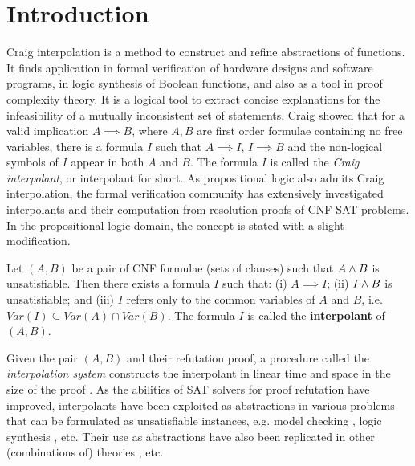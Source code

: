 \section{Introduction}

Craig interpolation is a method to construct and refine abstractions
of functions. It finds application in formal verification of hardware
designs and software programs, in logic synthesis of Boolean
functions, and also as a tool in proof complexity theory. It is a
logical tool to extract concise explanations for the infeasibility of
a mutually inconsistent set of statements. Craig
\cite{craig-interpolate} showed that for a valid implication $A
\implies B$, where $A, B$ are first order formulae containing no free
variables, there is a formula $I$ such that $A \implies I$, $I
\implies B$ and the non-logical symbols of $I$ appear in both $A$ and
$B$. The formula $I$ is called the {\it Craig interpolant}, or
interpolant for short. As  
propositional logic also admits Craig interpolation, the formal
verification community has extensively investigated interpolants and
their computation from resolution proofs of CNF-SAT problems. In the
propositional logic domain, the concept is stated with a slight
modification.  

\begin{Definition}\label{def:ci}
Let $(A, B)$ be a pair of CNF formulae (sets of clauses) such that $A
\wedge B$ is unsatisfiable. Then there exists a formula $I$ such that: (i)
$A\implies I$; (ii) $I \wedge B$ is unsatisfiable; and (iii) $I$ refers
only to the common variables of $A$ and $B$, i.e. $Var(I) \subseteq
Var(A) \cap Var(B)$. The formula $I$ is called the {\bf interpolant}
of $(A,B)$. 
\end{Definition}

Given the pair $(A, B)$ and their refutation proof, a procedure called
the {\it interpolation system} constructs the interpolant in linear
time and space in the size of the proof \cite{McMillan:CAV03}. As the
abilities of SAT solvers for proof refutation have improved,
interpolants have been exploited as abstractions in various problems
that can be formulated as unsatisfiable instances, e.g. model checking
\cite{McMillan:CAV03}, logic synthesis \cite{roland:bidecomp},
etc. Their use as abstractions have also been replicated in other
(combinations of) theories \cite{McMillan:TACAS04}
\cite{Kapur:SIGSOFT06} \cite{Cimatti:TACAS08} \cite{Griggio:FMCAD11},
etc.  


